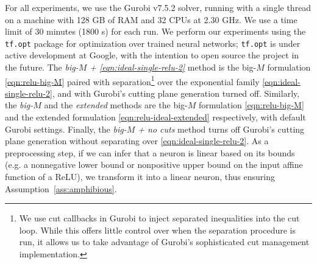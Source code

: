 \documentclass[smallextended]{svjour3}
\newcommand{\blue}[1]{{#1}}
\begin{document}
For all experiments, we use the Gurobi v7.5.2 solver, running with a single thread on a machine with 128 GB of RAM and 32 CPUs at 2.30 GHz. We use a time limit of 30 minutes (1800 s) for each run. We perform our experiments using the \texttt{tf.opt} package for optimization over trained neural networks; \texttt{tf.opt} is under active development at Google, with the intention to open source the project in the future. The \emph{big-$M$ + \eqref{eqn:ideal-single-relu-2}} method is the big-$M$ formulation \eqref{eqn:relu-big-M} paired with separation\footnote{We use cut callbacks in Gurobi to inject separated inequalities into the cut loop. While this offers little control over when the separation procedure is run, it allows us to take advantage of Gurobi's sophisticated cut management implementation.} over the exponential family \eqref{eqn:ideal-single-relu-2}, and with Gurobi's cutting plane generation turned off. Similarly, the \emph{big-$M$} and the \emph{extended} methods are the big-$M$ formulation \eqref{eqn:relu-big-M} and the extended formulation \eqref{eqn:relu-ideal-extended} respectively, with default Gurobi settings. Finally, the \emph{big-$M$ + no cuts} method turns off Gurobi's cutting plane generation without separating over \eqref{eqn:ideal-single-relu-2}. \blue{As a preprocessing step, if we can infer that a neuron is linear based on its bounds (e.g. a nonnegative lower bound or nonpositive upper bound on the input affine function of a ReLU), we transform it into a linear neuron, thus ensuring Assumption~\ref{ass:amphibious}.}
\end{document}
